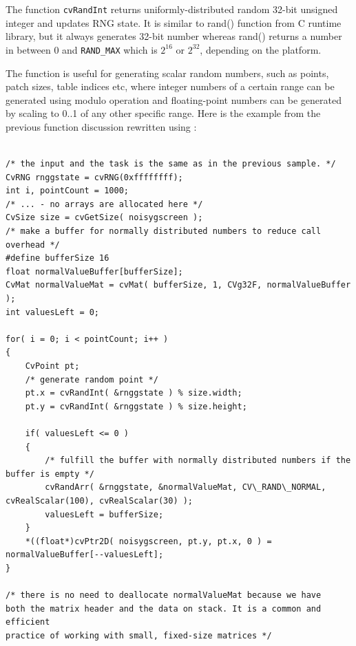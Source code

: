 \begin{description}
\end{description}

The function \texttt{cvRandInt} returns uniformly-distributed random
32-bit unsigned integer and updates RNG state. It is similar to rand()
function from C runtime library, but it always generates 32-bit number
whereas rand() returns a number in between 0 and \texttt{RAND\_MAX}
which is $2^{16}$ or $2^{32}$, depending on the platform.

The function is useful for generating scalar random numbers, such as
points, patch sizes, table indices etc, where integer numbers of a certain
range can be generated using modulo operation and floating-point numbers
can be generated by scaling to 0..1 of any other specific range. Here
is the example from the previous function discussion rewritten using
:

\begin{lstlisting}

/* the input and the task is the same as in the previous sample. */
CvRNG rnggstate = cvRNG(0xffffffff);
int i, pointCount = 1000;
/* ... - no arrays are allocated here */
CvSize size = cvGetSize( noisygscreen );
/* make a buffer for normally distributed numbers to reduce call overhead */
#define bufferSize 16
float normalValueBuffer[bufferSize];
CvMat normalValueMat = cvMat( bufferSize, 1, CVg32F, normalValueBuffer );
int valuesLeft = 0;

for( i = 0; i < pointCount; i++ )
{
    CvPoint pt;
    /* generate random point */
    pt.x = cvRandInt( &rnggstate ) % size.width;
    pt.y = cvRandInt( &rnggstate ) % size.height;

    if( valuesLeft <= 0 )
    {
        /* fulfill the buffer with normally distributed numbers if the buffer is empty */
        cvRandArr( &rnggstate, &normalValueMat, CV\_RAND\_NORMAL, cvRealScalar(100), cvRealScalar(30) );
        valuesLeft = bufferSize;
    }
    *((float*)cvPtr2D( noisygscreen, pt.y, pt.x, 0 ) = normalValueBuffer[--valuesLeft];
}

/* there is no need to deallocate normalValueMat because we have
both the matrix header and the data on stack. It is a common and efficient
practice of working with small, fixed-size matrices */

\end{lstlisting}

